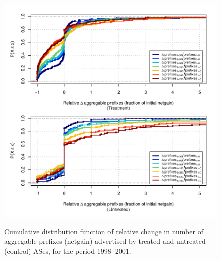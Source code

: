 \begin{figure}[H]
\begin{centering}
\begin{singlespace}
    \includegraphics[width=6in]{figures/behavior-rel_netgain-1998_2001-corr.pdf}
    \vspace{-2em}\\
    \caption{Cumulative distribution function of relative change in number of
    aggregable prefixes (netgain) advertised by treated and untreated (control)
    ASes, for the period 1998--2001.}
\end{singlespace}
\end{centering}
\end{figure}
